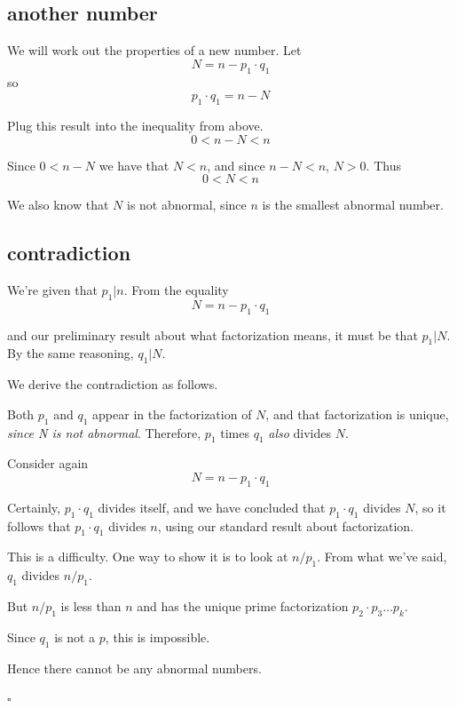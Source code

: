 \documentclass[11pt, oneside]{article}
\begin{document}
\subsection*{another number} 

We will work out the properties of a new number.  Let 
\[ N = n - p_1 \cdot q_1 \]
so
\[ p_1 \cdot q_1 = n - N \]

Plug this result into the inequality from above.
\[ 0 < n - N < n \]

Since $0 < n - N$ we have that $N < n$, and since $n - N < n$,  $N > 0$.   Thus
\[ 0 < N < n \]

We also know that $N$ is not abnormal, since $n$ is the smallest abnormal number.

\subsection*{contradiction} 
We're given that $p_1 | n$.  From the equality 
\[ N = n - p_1 \cdot q_1 \]

and our preliminary result about what factorization means, it must be that $p_1 | N$. By the same reasoning, $q_1 | N$.  

We derive the contradiction as follows.

Both $p_1$ and $q_1$ appear in the factorization of $N$, and that factorization is unique, \emph{since N is not abnormal}.  Therefore, $p_1$ times $q_1$ \emph{also} divides $N$.  

Consider again
\[ N = n - p_1 \cdot q_1 \]

Certainly, $p_1 \cdot q_1$ divides itself, and we have concluded that $p_1 \cdot q_1$ divides $N$, so it follows that $p_1 \cdot q_1$ divides $n$, using our standard result about factorization.  

This is a difficulty.  One way to show it is to look at $n/p_1$.  From what we've said, $q_1$ divides $n/p_1$.  

But $n/p_1$ is less than $n$ and has the unique prime factorization $p_2 \cdot p_3 \dots p_k$.

Since $q_1$ is not a $p$, this is impossible.  

Hence there cannot be any abnormal numbers.

$\square$
\end{document}
